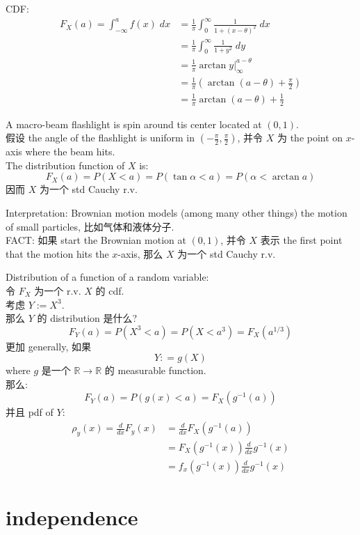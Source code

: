 CDF: \begin{align}
    F_X(a) = \int_{-\infty}^a f(x) \; dx &= \frac{1}{\pi} \int_0^\infty \frac{1}{1+ (x-\theta)^2} \; dx \\ 
    &= \frac{1}{\pi} \int_0^\infty  \frac{1}{1+ y^2} \; dy \\
    &= \frac{1}{\pi} \arctan y \Big|_{\infty}^{a - \theta} \\
    &=  \frac{1}{\pi} (\arctan (a - \theta) + \frac{\pi}{2}) \\
    &= \frac{1}{\pi} \arctan (a - \theta) + \frac{1}{2}
\end{align}

\begin{example}
A macro-beam flashlight is spin around tis center located at $(0,1)$.\\
假设 the angle of the flashlight is uniform in $(-\frac{\pi}{2}, \frac{\pi}{2})$, 并令 $X$ 为 the point on $x$-axis where the beam hits.\\
The distribution function of $X$ is: \[
F_X(a) = P(X < a) = P(\tan \alpha < a) = P(\alpha < \arctan a)
\]
因而 $X$ 为一个 std Cauchy r.v.  
\end{example}

Interpretation: Brownian motion models (among many other things) the motion of small particles, 比如气体和液体分子.\\

FACT: 如果 start the Brownian motion at $(0,1)$, 并令 $X $ 表示 the first point that the motion hits the $x$-axis, 那么 $X$ 为一个 std Cauchy r.v.  




\begin{remark}
Distribution of a function of a random variable: \\
令 $F_X$ 为一个 r.v. $X$ 的 cdf.\\
考虑 $Y := X^3$.\\
那么 $Y$ 的 distribution 是什么? \[
F_Y(a) = P(X^3 < a ) = P(X < a^3) = F_X(a^{1/3})
\]
更加 generally, 如果 \[
Y: = g(X)
\]
where $g$ 是一个 $\mathbb{R}\to \mathbb{R}$ 的 measurable function. \\
那么: \[
F_Y(a) = P(g(x) < a) = F_X(g^{-1} (a) )
\]
并且 pdf of $Y$: 
\begin{align}
\rho_y(x)  = \frac{d}{ dx} F_y(x) &= \frac{d}{dx} F_X(g^{-1}(a)) \\
&= F_X(g^{-1}(x)) \frac{d}{dx} g^{-1}(x) \\
&= f_x(g^{-1}(x)) \frac{d}{dx} g^{-1}(x)
\end{align}

\end{remark}












\section{independence}


